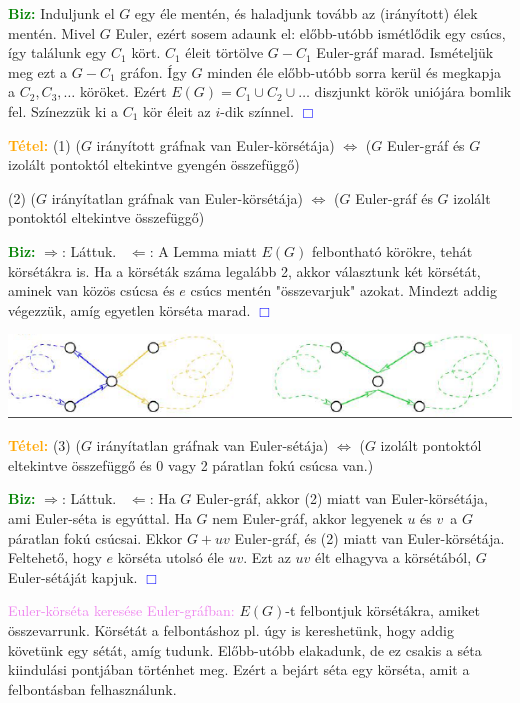 \documentclass[../../szobeli.tex]{subfiles}
\begin{document}
\begin{itemize}
        \textcolor{green}{\textbf{Biz:}} Induljunk el $G$ egy éle mentén, és haladjunk tovább az (irányított) élek mentén. Mivel $G$ Euler, ezért sosem adaunk el: előbb-utóbb ismétlődik egy csúcs, így találunk egy $C_1$ kört. $C_1$ éleit törtölve $G-C_1$ Euler-gráf marad. Ismételjük meg ezt a $G-C_1$ gráfon. Így $G$ minden éle előbb-utóbb sorra kerül és megkapja a $C_2, C_3, \dots$ köröket. Ezért $E(G) = C_1 \cup C_2 \cup \dots$ diszjunkt körök uniójára bomlik fel. Színezzük ki a $C_1$ kör éleit az $i$-dik színnel.  \textcolor{blue}{$\Box$}

        \textcolor{orange}{\textbf{Tétel:}} (1) ($G$ irányított gráfnak van Euler-körsétája) $\Longleftrightarrow$ ($G$ Euler-gráf és $G$ izolált pontoktól eltekintve gyengén összefüggő) 
        
        (2) ($G$ irányítatlan gráfnak van Euler-körsétája) $\Longleftrightarrow$ ($G$ Euler-gráf és $G$ izolált pontoktól eltekintve összefüggő)

        \textcolor{green}{\textbf{Biz:}} $\Rightarrow$: Láttuk. \checkmark $\Leftarrow$: A Lemma miatt $E(G)$ felbontható körökre, tehát körsétákra is. Ha a körséták száma legalább 2, akkor választunk két körsétát, aminek van közös csúcsa és $e$ csúcs mentén "összevarjuk" azokat. Mindezt addig végezzük, amíg egyetlen körséta marad.  \textcolor{blue}{$\Box$}

        \includegraphics[width=\textwidth]{./img/3.png}

        \textcolor{orange}{\textbf{Tétel:}} (3) ($G$ irányítatlan gráfnak van Euler-sétája) $\Longleftrightarrow$ ($G$ izolált pontoktól eltekintve összefüggő és 0 vagy 2 páratlan fokú csúcsa van.)

        \textcolor{green}{\textbf{Biz:}} $\Rightarrow$: Láttuk. \checkmark $\Leftarrow$: Ha $G$ Euler-gráf, akkor (2) miatt van Euler-körsétája, ami Euler-séta is egyúttal. Ha $G$ nem Euler-gráf, akkor legyenek $u$ és $v$ a $G$ páratlan fokú csúcsai. Ekkor $G + uv$ Euler-gráf, és (2) miatt van Euler-körsétája. Feltehető, hogy $e$ körséta utolsó éle $uv$. Ezt az $uv$ élt elhagyva a körsétából, $G$ Euler-sétáját kapjuk. \textcolor{blue}{$\Box$}

        \textcolor{violet}{Euler-körséta keresése Euler-gráfban:} $E(G)$-t felbontjuk körsétákra, amiket összevarrunk. Körsétát a felbontáshoz pl. úgy is kereshetünk, hogy addig követünk egy sétát, amíg tudunk. Előbb-utóbb elakadunk, de ez csakis a séta kiindulási pontjában történhet meg. Ezért a bejárt séta egy körséta, amit a felbontásban felhasználunk.


\end{itemize}
\end{document}
